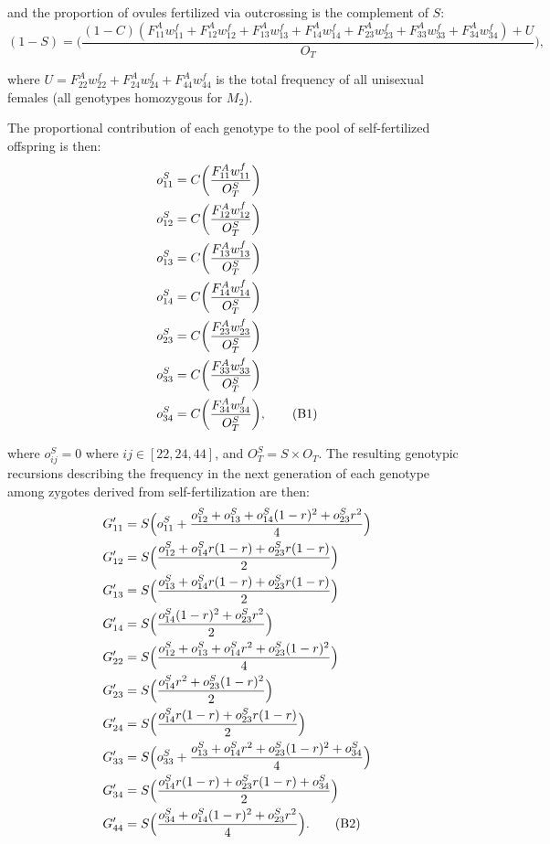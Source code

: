\documentclass{article}
\newcommand\numberthis{\addtocounter{equation}{1}\tag{\theequation}}
\begin{document}
\noindent and the proportion of ovules fertilized via outcrossing is the complement of $S$:
\begin{equation} 
(1 - S) = \bigg( \frac{(1 - C)(F^A_{11} w^f_{11} + F^A_{12} w^f_{12} + F^A_{13} w^f_{13} + F^A_{14} w^f_{14} +
                   F^A_{23} w^f_{23} + F^A_{33} w^f_{33} + F^A_{34} w^f_{34}) + U}{O_T}\bigg),
\end{equation}

\noindent where $U = F^A_{22} w^f_{22} + F^A_{24} w^f_{24} + F^A_{44} w^f_{44}$ is the total frequency of all unisexual females (all genotypes homozygous for $M_2$). 

The proportional contribution of each genotype to the pool of self-fertilized offspring is then:
\begin{align*} \label{eq:RecSelfOvules}
    o^S_{11} &= C \bigg(\frac{F^A_{11} w^f_{11}}{O^S_T} \bigg) \\
    o^S_{12} &= C \bigg(\frac{F^A_{12} w^f_{12}}{O^S_T} \bigg) \\
    o^S_{13} &= C \bigg(\frac{F^A_{13} w^f_{13}}{O^S_T} \bigg) \\
    o^S_{14} &= C \bigg(\frac{F^A_{14} w^f_{14}}{O^S_T} \bigg) \\
    o^S_{23} &= C \bigg(\frac{F^A_{23} w^f_{23}}{O^S_T} \bigg) \\
    o^S_{33} &= C \bigg(\frac{F^A_{33} w^f_{33}}{O^S_T} \bigg) \\
    o^S_{34} &= C \bigg(\frac{F^A_{34} w^f_{34}}{O^S_T} \bigg), \numberthis
\end{align*}

\noindent where $o^S_{ij} = 0$ where $ij \in [22,24,44]$, and $O^S_T = S \times O_T$. The resulting genotypic recursions describing the frequency in the next generation of each genotype among zygotes derived from self-fertilization are then:
\begin{align*} \label{eq:RecSelfRecs}
    G'_{11} &= S \Big(o^S_{11} + \frac{o^S_{12} + o^S_{13} + o^S_{14}(1-r)^2 + o^S_{23}r^2}{4} \Big) \\
    G'_{12} &= S \Big( \frac{o^S_{12} + o^S_{14}r(1-r) + o^S_{23}r(1-r)}{2} \Big) \\
    G'_{13} &= S \Big( \frac{o^S_{13} + o^S_{14}r(1-r) + o^S_{23}r(1-r)}{2} \Big) \\
    G'_{14} &= S \Big( \frac{o^S_{14}(1-r)^2 + o^S_{23}r^2}{2} \Big) \\
    G'_{22} &= S \Big( \frac{o^S_{12} + o^S_{13} + o^S_{14}r^2 + o^S_{23}(1-r)^2}{4} \Big) \\
    G'_{23} &= S \Big( \frac{o^S_{14}r^2 + o^S_{23}(1-r)^2}{2} \Big) \\
    G'_{24} &= S \Big( \frac{o^S_{14}r(1-r) + o^S_{23}r(1-r)}{2} \Big) \\
    G'_{33} &= S \Big(o^S_{33} + \frac{o^S_{13} + o^S_{14}r^2 + o^S_{23}(1-r)^2 + o^S_{34}}{4} \Big) \\
    G'_{34} &= S \Big( \frac{o^S_{14}r(1-r) + o^S_{23}r(1-r) + o^S_{34}}{2} \Big) \\
    G'_{44} &= S \Big( \frac{o^S_{34} + o^S_{14}(1-r)^2 + o^S_{23}r^2}{4} \Big). \numberthis
\end{align*}
\end{document}
